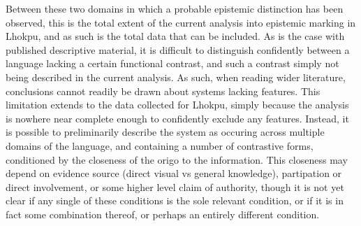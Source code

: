 Between these two domains in which a probable epistemic distinction has been observed, this is the total extent of the current analysis into epistemic marking in Lhokpu, and as such is the total data that can be included. As is the case with published descriptive material, it is difficult to distinguish confidently between a language lacking a certain functional contrast, and such a contrast simply not being described in the current analysis. As such, when reading wider literature, conclusions cannot readily be drawn about systems lacking features. This limitation extends to the data collected for Lhokpu, simply because the analysis is nowhere near complete enough to confidently exclude any features. Instead, it is possible to preliminarily describe the system as occuring across multiple domains of the language, and containing a number of contrastive forms, conditioned by the closeness of the origo to the information. This closeness may depend on evidence source (direct visual vs general knowledge), partipation or direct involvement, or some higher level claim of authority, though it is not yet clear if any single of these conditions is the sole relevant condition, or if it is in fact some combination thereof, or perhaps an entirely different condition.